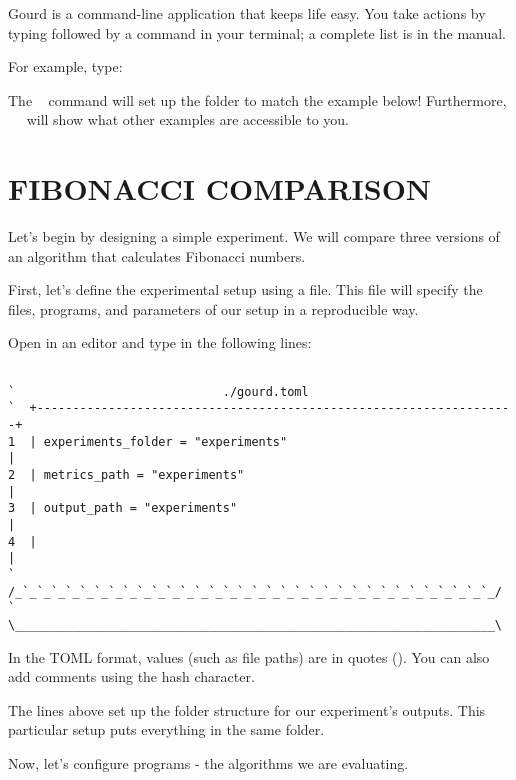 \documentclass[a4paper,english]{article}
\begin{document}
\begin{adjustwidth}{18pt}{0pt}
    Gourd is a command-line application that keeps life easy.
    You take actions by typing  followed by a command in your
    terminal; a complete list is in the manual.

    For example, type:
    ~
    ~~

    The ~ command will set up the  folder
    to match the example below!
    Furthermore, ~~ will show what
    other examples are accessible to you.

    \section{FIBONACCI COMPARISON}

    Let's begin by designing a simple experiment.
    We will compare three versions of an algorithm that calculates Fibonacci
    numbers.

    First, let's define the experimental setup using a 
    file. This file will specify the files, programs, and parameters of our
    setup in a reproducible way.

    Open  in an editor and type in the following lines:

    \begin{verbatim}

`                             ./gourd.toml
`  +-------------------------------------------------------------------+
1  | experiments_folder = "experiments"                                |
2  | metrics_path = "experiments"                                      |
3  | output_path = "experiments"                                       |
4  |                                                                   |
`  /_`_`_`_`_`_`_`_`_`_`_`_`_`_`_`_`_`_`_`_`_`_`_`_`_`_`_`_`_`_`_`_`_`_/
`  \___________________________________________________________________\
    \end{verbatim}

    In the TOML format, values (such as file paths) are in quotes ().
    You can also add comments using the hash character.

    The lines above set up the folder structure for our experiment's outputs.
    This particular setup puts everything in the same folder.

    Now, let's configure programs - the algorithms we are evaluating.


\end{adjustwidth}
\end{document}
